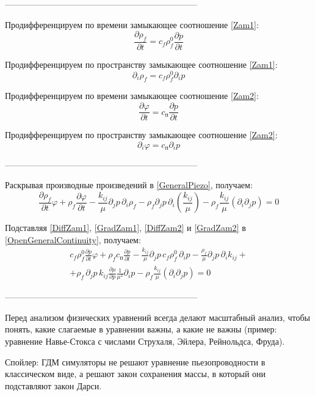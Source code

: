 \documentclass[a4paper,12pt]{article}
\newcommand{\beq}{\begin{equation}}
\newcommand{\eeq}{\end{equation}}
\begin{document}
--------------------------------------------------------------------

Продифференцируем по времени замыкающее соотношение \eqref{Zam1}:
\beq\label{DiffZam1}
\frac{\partial\rho_f}{\partial t}=c_f\rho_f^0\frac{\partial p}{\partial t}
\eeq

Продифференцируем по пространству замыкающее соотношение \eqref{Zam1}:
\beq\label{GradZam1}
\partial_i\rho_f=c_f\rho_f^0\partial_i p
\eeq

Продифференцируем по времени замыкающее соотношение \eqref{Zam2}:
\beq\label{DiffZam2}
\frac{\partial\varphi}{\partial t}=c_\text{п}\frac{\partial p}{\partial t}
\eeq

Продифференцируем по пространству замыкающее соотношение \eqref{Zam2}:
\beq\label{GradZam2}
\partial_i\varphi=c_\text{п}\partial_i p
\eeq

--------------------------------------------------------------------

Раскрывая производные произведений в \eqref{GeneralPiezo}, получаем:
\beq\label{OpenGeneralContinuity}
\frac{\partial\rho_f}{\partial t}\varphi+\rho_f\frac{\partial\varphi}{\partial t}-\frac{k_{ij}}{\mu}\partial_j p\,\partial_i\rho_f-\rho_f\partial_j p\,\partial_i\!\left(\frac{k_{ij}}{\mu}\right)-\rho_f\frac{k_{ij}}{\mu}\left(\partial_i\partial_j p\right)=0
\eeq

Подставляя \eqref{DiffZam1}, \eqref{GradZam1}, \eqref{DiffZam2} и \eqref{GradZam2} в \eqref{OpenGeneralContinuity}, получаем:
\begin{multline}\label{Expanded}
c_f\rho_f^0\frac{\partial p}{\partial t}\varphi+\rho_f c_\text{п}\frac{\partial p}{\partial t}-\frac{k_{ij}}{\mu}\partial_j p\,c_f\rho_f^0\,\partial_i p-\frac{\rho_f}{\mu}\partial_j p\,\partial_i k_{ij}+\\+\rho_f\,\partial_j p\,k_{ij}\frac{\partial\mu}{\partial p}\frac{1}{\mu^2}\partial_i p-\rho_f\frac{k_{ij}}{\mu}\left(\partial_i\partial_j p\right)=0
\end{multline}

--------------------------------------------------------------------

Перед анализом физических уравнений всегда делают масштабный анализ, чтобы понять, какие слагаемые в уравнении важны, а какие не важны (пример: уравнение Навье-Стокса с числами Струхаля, Эйлера, Рейнольдса, Фруда).

Спойлер: ГДМ симуляторы не решают уравнение пьезопроводности в классическом виде, а решают закон сохранения массы, в который они подставляют закон Дарси.
\end{document}
